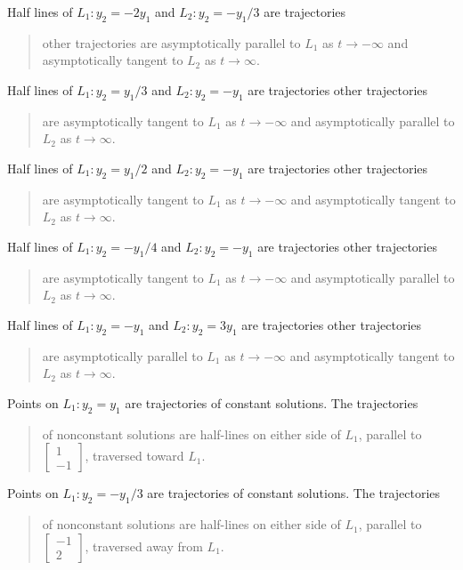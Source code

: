Half lines of $L_{1}:y_{2}=-2y_{1}$ and $L_{2}:y_{2}=-y_{1}/3$ are trajectories
\begin{quote}other
trajectories are
asymptotically parallel to $L_{1}$ as $t\to-\infty$ and
asymptotically tangent to $L_{2}$ as $t\to\infty$.
\end{quote}

Half lines of $L_{1}:y_{2}=y_{1}/3$ and $L_{2}:y_{2}=-y_{1}$ are trajectories
other trajectories
\begin{quote}are
asymptotically tangent to $L_{1}$ as $t\to-\infty$ and
asymptotically parallel to $L_{2}$ as $t\to\infty$.
\end{quote}

Half lines of $L_{1}:y_{2}=y_{1}/2$ and $L_{2}:y_{2}=-y_{1}$ are trajectories
other trajectories
\begin{quote}are
asymptotically tangent to $L_{1}$ as $t\to-\infty$ and
asymptotically tangent to $L_{2}$ as $t\to\infty$.
\end{quote}

Half lines of $L_{1}:y_{2}=-y_{1}/4$ and $L_{2}:y_{2}=-y_{1}$ are trajectories
other trajectories
\begin{quote}are
asymptotically tangent to $L_{1}$ as $t\to-\infty$ and
asymptotically parallel to $L_{2}$ as $t\to\infty$.
\end{quote}

Half lines of $L_{1}:y_{2}=-y_{1}$ and $L_{2}:y_{2}=3y_{1}$ are trajectories
other trajectories
\begin{quote}are
asymptotically parallel to $L_{1}$ as $t\to-\infty$ and
asymptotically tangent to $L_{2}$ as $t\to\infty$.
\end{quote}

Points on $L_{1}:y_{2}=y_{1}$ are trajectories of constant solutions.
The trajectories
\begin{quote}
of nonconstant solutions are half-lines on either
side of $L_{1}$, parallel to
$\left[\begin{array}{r}
1\\{-1}
\end{array}\right]$,
 traversed
toward
$L_{1}$.
\end{quote}

Points on $L_{1}:y_{2}=-y_{1}/3$ are trajectories of constant solutions.
The trajectories
\begin{quote}
of nonconstant solutions are half-lines on either
side of $L_{1}$, parallel to
$\left[\begin{array}{r}
-1\\2
\end{array}\right]$,
 traversed away
from
$L_{1}$.
\end{quote}


